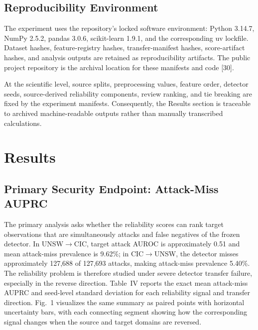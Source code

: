 \documentclass[conference]{IEEEtran}
\begin{document}
\subsection{Reproducibility Environment}

The experiment uses the repository's locked software environment: Python 3.14.7, NumPy 2.5.2, pandas 3.0.6, scikit-learn 1.9.1, and the corresponding uv lockfile. Dataset hashes, feature-registry hashes, transfer-manifest hashes, score-artifact hashes, and analysis outputs are retained as reproducibility artifacts. The public project repository is the archival location for these manifests and code [30].

At the scientific level, source splits, preprocessing values, feature order, detector seeds, source-derived reliability components, review ranking, and tie breaking are fixed by the experiment manifests. Consequently, the Results section is traceable to archived machine-readable outputs rather than manually transcribed calculations.

\section{Results}

\subsection{Primary Security Endpoint: Attack-Miss AUPRC}

The primary analysis asks whether the reliability scores can rank target observations that are simultaneously attacks and false negatives of the frozen detector. In UNSW$\rightarrow$CIC, target attack AUROC is approximately 0.51 and mean attack-miss prevalence is 9.62\%; in CIC$\rightarrow$UNSW, the detector misses approximately 127,688 of 127,693 attacks, making attack-miss prevalence 5.40\%. The reliability problem is therefore studied under severe detector transfer failure, especially in the reverse direction. Table~IV reports the exact mean attack-miss AUPRC and seed-level standard deviation for each reliability signal and transfer direction. Fig.~1 visualizes the same summary as paired points with horizontal uncertainty bars, with each connecting segment showing how the corresponding signal changes when the source and target domains are reversed.
\end{document}

